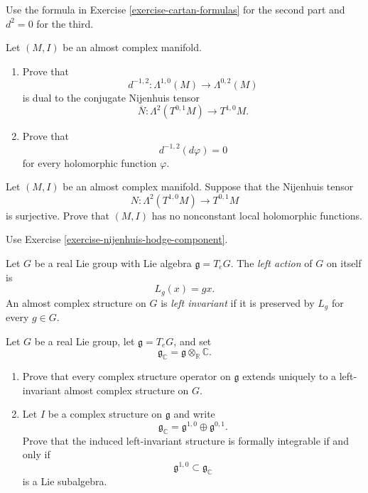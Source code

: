Use the formula in Exercise
\ref{exercise-cartan-formulas} for the
second part and $d^2=0$ for the third.

\begin{exercise}
\label{exercise-nijenhuis-hodge-component}
Let $(M,I)$ be an almost complex manifold.

\begin{enumerate}
\item Prove that
$$
d^{-1,2}:\Lambda^{1,0}(M)
\longrightarrow\Lambda^{0,2}(M)
$$
is dual to the conjugate Nijenhuis tensor
$$
\overline{N}:\Lambda^2(T^{0,1}M)
\longrightarrow T^{1,0}M.
$$

\item Prove that
$$
d^{-1,2}(d\varphi)=0
$$
for every holomorphic function $\varphi$.
\end{enumerate}
\end{exercise}

\begin{exercise}
\label{exercise-surjective-nijenhuis}
Let $(M,I)$ be an almost complex manifold.
Suppose that the Nijenhuis tensor
$$
N:\Lambda^2(T^{1,0}M)
\longrightarrow T^{0,1}M
$$
is surjective. Prove that $(M,I)$ has no
nonconstant local holomorphic functions.
\end{exercise}

Use Exercise
\ref{exercise-nijenhuis-hodge-component}.

\begin{definition}
\label{definition-left-invariant-complex}
Let $G$ be a real Lie group with Lie algebra
$\mathfrak{g}=T_eG$. The {\it left action}
of $G$ on itself is
$$
L_g(x)=gx.
$$
An almost complex structure on $G$ is
{\it left invariant} if it is preserved by
$L_g$ for every $g\in G$.
\end{definition}

\begin{exercise}
\label{exercise-left-invariant-integrable}
Let $G$ be a real Lie group, let
$\mathfrak{g}=T_eG$, and set
$$
\mathfrak{g}_{\mathbb{C}}
=\mathfrak{g}\otimes_{\mathbb{R}}
\mathbb{C}.
$$

\begin{enumerate}
\item Prove that every complex structure
operator on $\mathfrak{g}$ extends uniquely
to a left-invariant almost complex structure
on $G$.

\item Let $I$ be a complex structure on
$\mathfrak{g}$ and write
$$
\mathfrak{g}_{\mathbb{C}}
=\mathfrak{g}^{1,0}
\oplus\mathfrak{g}^{0,1}.
$$
Prove that the induced left-invariant
structure is formally integrable if and
only if
$$
\mathfrak{g}^{1,0}
\subset\mathfrak{g}_{\mathbb{C}}
$$
is a Lie subalgebra.
\end{enumerate}
\end{exercise}

